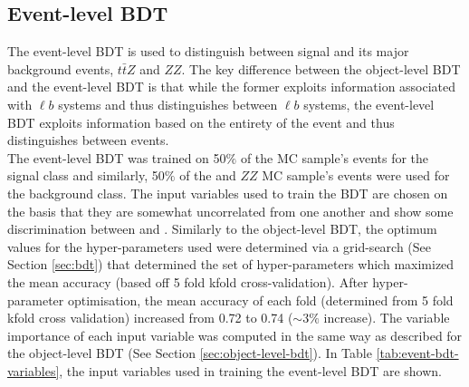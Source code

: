 \subsection{Event-level BDT}
\label{sec:event-level-bdt}
The event-level BDT is used to distinguish between signal and its major background events, $t\bar{t}Z$ and $ZZ$. The key difference between the object-level BDT and the event-level BDT is that while the former exploits information associated with $\ell b$ systems and thus distinguishes between $\ell b$ systems, the event-level BDT exploits information based on the entirety of the event and thus distinguishes between events.\\

The event-level BDT was trained on 50$\%$ of the \tWZ MC sample's events for the signal class and similarly, 50$\%$ of the \ttZ and $ZZ$ MC sample's events were used for the background class. The input variables used to train the BDT are chosen on the basis that they are somewhat uncorrelated from one another and show some discrimination between \tWZ and \ttZ. Similarly to the object-level BDT, the optimum values for the hyper-parameters used were determined via a grid-search (See Section \ref{sec:bdt}) that determined the set of hyper-parameters which maximized the mean accuracy (based off 5 fold kfold cross-validation). After hyper-parameter optimisation, the mean accuracy of each fold (determined from 5 fold kfold cross validation) increased from 0.72 to 0.74 ($\sim 3\%$ increase). The variable importance of each input variable was computed in the same way as described for the object-level BDT (See Section \ref{sec:object-level-bdt}). In Table \ref{tab:event-bdt-variables}, the input variables used in training the event-level BDT are shown.
\begin{table}[htbp!]

\caption{A list of the input variables used in the event-level BDT, ordered by variable importance (descending, top to bottom) is shown.}
	\label{tab:event-bdt-variables}
\end{table}

